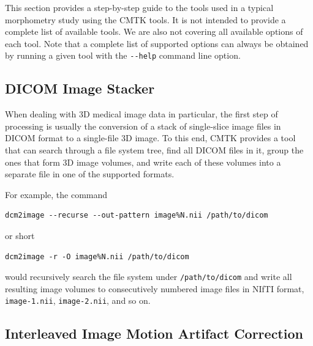 \documentclass{InsightArticle}
\begin{document}
This section provides a step-by-step guide to the tools used in a typical
morphometry study using the CMTK tools. It is not intended to provide a
complete list of available tools. We are also not covering all available
options of each tool. Note that a complete list of supported options can
always be obtained by running a given tool with the \verb|--help| command line
option.

\subsection{DICOM Image Stacker}

When dealing with 3D medical image data in particular, the first step of
processing is usually the conversion of a stack of single-slice image files in
DICOM format to a single-file 3D image. To this end, CMTK provides a tool that
can search through a file system tree, find all DICOM files in it, group the
ones that form 3D image volumes, and write each of these volumes into a
separate file in one of the supported formats.

For example, the command
\begin{verbatim}
dcm2image --recurse --out-pattern image%N.nii /path/to/dicom
\end{verbatim}
or short
\begin{verbatim}
dcm2image -r -O image%N.nii /path/to/dicom
\end{verbatim}
would recursively search the file system under {\tt /path/to/dicom} and write
all resulting image volumes to consecutively numbered image files in NIfTI
format, {\tt image-1.nii},  {\tt image-2.nii}, and so on.

\subsection{Interleaved Image Motion Artifact Correction}
\end{document}
